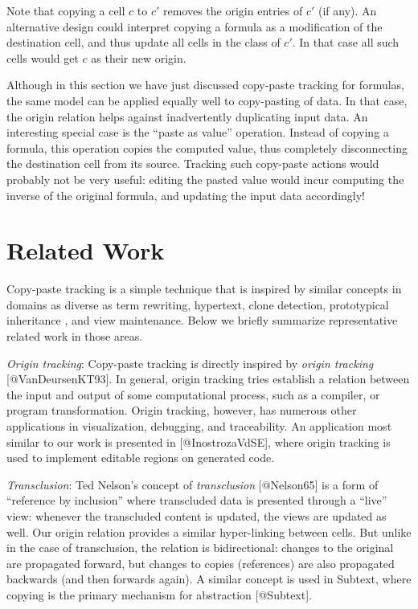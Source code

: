 \documentclass[11pt,]{article}
\begin{document}
Note that copying a cell \(c\) to \(c'\) removes the origin entries of
\(c'\) (if any). An alternative design could interpret copying a formula
as a modification of the destination cell, and thus update all cells in
the class of \(c'\). In that case all such cells would get \(c\) as
their new origin.

Although in this section we have just discussed copy-paste tracking for
formulas, the same model can be applied equally well to copy-pasting of
data. In that case, the origin relation helps against inadvertently
duplicating input data. An interesting special case is the ``paste as
value'' operation. Instead of copying a formula, this operation copies
the computed value, thus completely disconnecting the destination cell
from its source. Tracking such copy-paste actions would probably not be
very useful: editing the pasted value would incur computing the inverse
of the original formula, and updating the input data accordingly!

\section{Related Work}\label{related-work}

Copy-paste tracking is a simple technique that is inspired by similar
concepts in domains as diverse as term rewriting, hypertext, clone
detection, prototypical inheritance , and view maintenance. Below we
briefly summarize representative related work in those areas.

\emph{Origin tracking}: Copy-paste tracking is directly inspired by
\emph{origin tracking} {[}@VanDeursenKT93{]}. In general, origin
tracking tries establish a relation between the input and output of some
computational process, such as a compiler, or program transformation.
Origin tracking, however, has numerous other applications in
visualization, debugging, and traceability. An application most similar
to our work is presented in {[}@InostrozaVdSE{]}, where origin tracking
is used to implement editable regions on generated code.

\emph{Transclusion}: Ted Nelson's concept of \emph{transclusion}
{[}@Nelson65{]} is a form of ``reference by inclusion'' where
transcluded data is presented through a ``live'' view: whenever the
transcluded content is updated, the views are updated as well. Our
origin relation provides a similar hyper-linking between cells. But
unlike in the case of transclusion, the relation is bidirectional:
changes to the original are propagated forward, but changes to copies
(references) are also propagated backwards (and then forwards again). A
similar concept is used in Subtext, where copying is the primary
mechanism for abstraction {[}@Subtext{]}.
\end{document}
